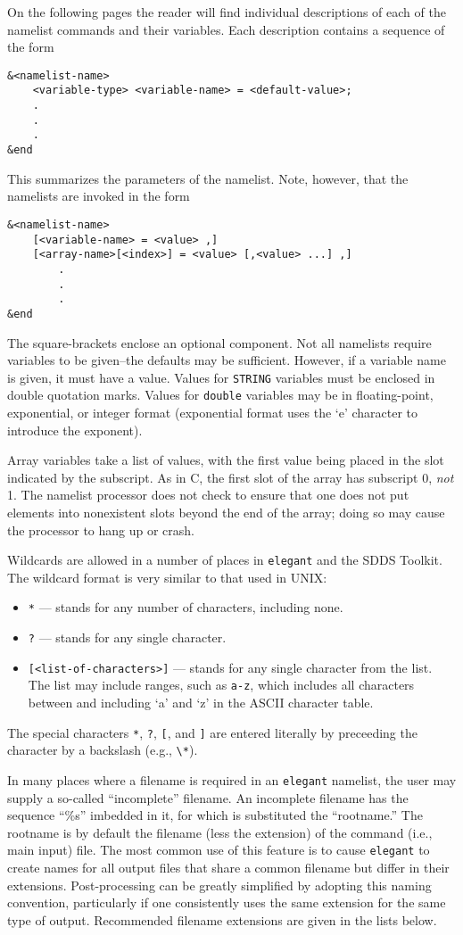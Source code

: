 \documentclass[11pt]{article}
\begin{document}
On the following pages the reader will find individual descriptions of each of the namelist commands and their 
variables.  Each description contains a sequence of the form
\begin{verbatim}
&<namelist-name>
    <variable-type> <variable-name> = <default-value>;
    .
    .
    .
&end
\end{verbatim}
This summarizes the parameters of the namelist.  Note, however, that the namelists are invoked in the form
\begin{verbatim}
&<namelist-name>
    [<variable-name> = <value> ,]
    [<array-name>[<index>] = <value> [,<value> ...] ,]
        .
        .
        .
&end
\end{verbatim}  The square-brackets enclose an optional component.  Not all namelists require variables to 
be given--the defaults may be sufficient.  However, if a variable name
is given, it must have a value.  Values for \verb|STRING| variables
must be enclosed in double quotation marks.  Values for \verb|double|
variables may be in floating-point, exponential, or integer format
(exponential format uses the `e' character to introduce the exponent).

Array variables take a list of values, with the first value being
placed in the slot indicated by the subscript.  As in C, the first
slot of the array has subscript 0, {\em not} 1.  The namelist
processor does not check to ensure that one does not put elements into
nonexistent slots beyond the end of the array; doing so may cause the
processor to hang up or crash.

Wildcards are allowed in a number of places in {\tt elegant} and the SDDS Toolkit.  The wildcard format is
very similar to that used in UNIX:
\begin{itemize}
\item \verb|*| --- stands for any number of characters, including none.
\item \verb|?| --- stands for any single character.
\item \verb|[<list-of-characters>]| --- stands for any single character from the list.  The list may include
ranges, such as \verb|a-z|, which includes all characters between and including `a' and `z' in the ASCII
character table.
\end{itemize}
The special characters \verb|*|, \verb|?|, \verb|[|, and \verb|]| are entered literally by preceeding the character by a
backslash (e.g., \verb|\*|).

In many places where a filename is required in an {\tt elegant}
namelist, the user may supply a so-called ``incomplete'' filename.  An
incomplete filename has the sequence ``\%s'' imbedded in it, for which
is substituted the ``rootname.''  The rootname is by default the
filename (less the extension) of the command (i.e., main input) file.  The most common
use of this feature is to cause {\tt elegant} to create names for all
output files that share a common filename but differ in their
extensions.  Post-processing can be greatly simplified by adopting
this naming convention, particularly if one consistently uses the same
extension for the same type of output.  Recommended filename
extensions are given in the lists below.
\end{document}
